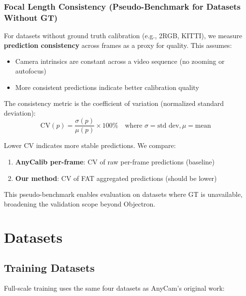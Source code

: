 \subsubsection{Focal Length Consistency (Pseudo-Benchmark for Datasets Without GT)}

For datasets without ground truth calibration (e.g., 2RGB, KITTI), we measure \textbf{prediction consistency} across frames as a proxy for quality. This assumes:
\begin{itemize}
    \item Camera intrinsics are constant across a video sequence (no zooming or autofocus)
    \item More consistent predictions indicate better calibration quality
\end{itemize}

The consistency metric is the coefficient of variation (normalized standard deviation):
\begin{equation}
    \text{CV}(p) = \frac{\sigma(p)}{\mu(p)} \times 100\% \quad \text{where } \sigma = \text{std dev}, \mu = \text{mean}
\end{equation}

Lower CV indicates more stable predictions. We compare:
\begin{enumerate}
    \item \textbf{AnyCalib per-frame}: CV of raw per-frame predictions (baseline)
    \item \textbf{Our method}: CV of FAT aggregated predictions (should be lower)
\end{enumerate}

This pseudo-benchmark enables evaluation on datasets where GT is unavailable, broadening the validation scope beyond Objectron.

\section{Datasets}\label{sec:datasets}

\subsection{Training Datasets}\label{sec:training-datasets}

Full-scale training uses the same four datasets as AnyCam's original work:

